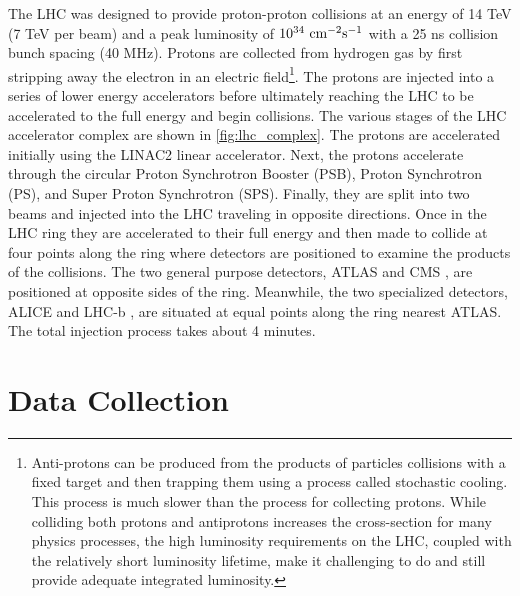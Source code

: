 The LHC was designed to provide proton-proton collisions
at an energy of 14 TeV (7 TeV per beam) 
and a peak luminosity of $10^{34}~\textrm{cm}^{-2}\textrm{s}^{-1}$ with a 25 ns collision
bunch spacing (40 MHz).
Protons are collected from hydrogen gas by first stripping away 
the electron in an electric field\footnote{Anti-protons
can be produced  from the products of 
particles collisions with a fixed target and
then trapping them using a process called stochastic cooling. This process
is much slower than the process for collecting protons. While colliding both 
protons and antiprotons increases the cross-section
for many physics processes, the high luminosity requirements on the LHC,
coupled with the relatively short luminosity lifetime, make it challenging
to do and still provide adequate integrated luminosity.}.
The protons are injected
into a series of lower energy accelerators before ultimately 
reaching the LHC to be accelerated to the full energy and 
begin collisions. The various stages of the LHC accelerator
complex are shown in \fig\ref{fig:lhc_complex}.
The protons are accelerated initially using the LINAC2 linear
accelerator. Next, the protons accelerate through the circular
Proton Synchrotron Booster (PSB), Proton Synchrotron (PS),
and Super Proton Synchrotron (SPS). Finally, they 
are split into two beams and injected into the LHC
traveling in opposite directions. Once in the LHC
ring they are accelerated to their full energy and then made
to collide at four points along the ring where detectors
are positioned to examine the products of the collisions.
The two general purpose detectors, ATLAS \cite{ATLAS} and CMS \cite{CMS}, 
are positioned at opposite sides of the ring. 
Meanwhile, the two specialized detectors, ALICE \cite{ALICE} 
and LHC-b \cite{LHCB}, are situated at equal points along the ring
nearest ATLAS.
The total injection process takes about 4 minutes.




\section{Data Collection}

